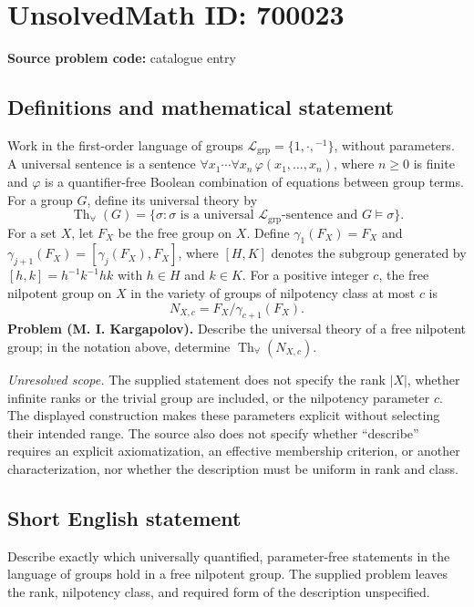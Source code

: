 \documentclass[11pt]{article}
\begin{document}
\section*{UnsolvedMath ID: 700023}
\textbf{Source problem code:} catalogue entry
\subsection{Definitions and mathematical statement}
Work in the first-order language of groups \(\mathcal L_{\mathrm{grp}}=\{1,\cdot,{}^{-1}\}\), without parameters. A universal sentence is a sentence \(\forall x_1\cdots\forall x_n\,\varphi(x_1,\ldots,x_n)\), where \(n\geq 0\) is finite and \(\varphi\) is a quantifier-free Boolean combination of equations between group terms. For a group \(G\), define its universal theory by
\[
\operatorname{Th}_{\forall}(G)=\{\sigma:\sigma\text{ is a universal }\mathcal L_{\mathrm{grp}}\text{-sentence and }G\models\sigma\}.
\]
For a set \(X\), let \(F_X\) be the free group on \(X\). Define \(\gamma_1(F_X)=F_X\) and \(\gamma_{j+1}(F_X)=[\gamma_j(F_X),F_X]\), where \([H,K]\) denotes the subgroup generated by \([h,k]=h^{-1}k^{-1}hk\) with \(h\in H\) and \(k\in K\). For a positive integer \(c\), the free nilpotent group on \(X\) in the variety of groups of nilpotency class at most \(c\) is
\[
N_{X,c}=F_X/\gamma_{c+1}(F_X).
\]
\textbf{Problem (M. I. Kargapolov).} Describe the universal theory of a free nilpotent group; in the notation above, determine \(\operatorname{Th}_{\forall}(N_{X,c})\).

\textit{Unresolved scope.} The supplied statement does not specify the rank \(|X|\), whether infinite ranks or the trivial group are included, or the nilpotency parameter \(c\). The displayed construction makes these parameters explicit without selecting their intended range. The source also does not specify whether ``describe'' requires an explicit axiomatization, an effective membership criterion, or another characterization, nor whether the description must be uniform in rank and class.
\subsection{Short English statement}
Describe exactly which universally quantified, parameter-free statements in the language of groups hold in a free nilpotent group. The supplied problem leaves the rank, nilpotency class, and required form of the description unspecified.
\end{document}
